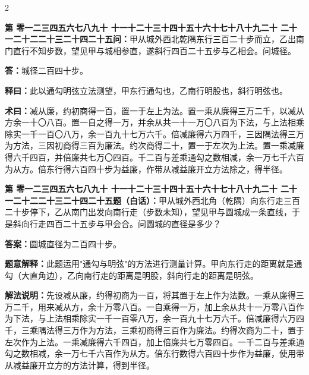 \documentclass[10pt,a4paper]{article}
\newcounter{probnum}
\newcounter{probnumvol}[section]
\newcommand{\chnum}[1]{%
  \ifcase#1 零\or 一\or 二\or 三\or 四\or 五\or 六\or 七\or 八\or 九\or 十\or
    十一\or 十二\or 十三\or 十四\or 十五\or 十六\or 十七\or 十八\or 十九\or 二十\or
    二十一\or 二十二\or 二十三\or 二十四\or 二十五\fi}
\newcommand{\problemclassical}[1]{%
  \stepcounter{probnumvol}%
  \par\noindent
  \textcolor{classicalcolor}{\textbf{第\chnum{\value{probnumvol}}问：}}#1\par\smallskip
}
\newcommand{\problemmodern}[1]{%
  \par\noindent
  \textcolor{moderncolor}{\textbf{第\chnum{\value{probnumvol}}题（白话）：}}#1\par\smallskip
}
\newcommand{\answerclassical}[1]{%
  \par\noindent\textcolor{classicalcolor}{\textbf{答：}}#1\par
}
\newcommand{\answermodern}[1]{%
  \par\noindent\textcolor{moderncolor}{\textbf{答案：}}#1\par
}
\newcommand{\shiyiclassical}[1]{%
  \par\noindent\textcolor{classicalcolor}{\textbf{释曰：}}#1\par
}
\newcommand{\shiyimodern}[1]{%
  \par\noindent\textcolor{moderncolor}{\textbf{题意解释：}}#1\par
}
\newcommand{\shuyueclassical}[1]{%
  \par\noindent\textcolor{classicalcolor}{\textbf{术曰：}}#1\par
}
\newcommand{\shuyuemodern}[1]{%
  \par\noindent\textcolor{moderncolor}{\textbf{解法说明：}}#1\par
}
\begin{document}
\begin{paracol}{2}

\problemclassical{甲从城外西北乾隅东行三百二十步而立，乙出南门直行不知步数，望见甲与城相参直，遂斜行四百二十五步与乙相会。问城径。}

\answerclassical{城径二百四十步。}

\shiyiclassical{此以通勾明弦立法测望，甲东行通勾也，乙南行明股也，斜行明弦也。}

\shuyueclassical{减从廉，约初商得一百，置一于左上为法。置一乘从廉得三万二千，以减从方余一十〇八百。置一自之得一万，并余从共一十一万〇八百为下法，与上法相乘除实一千一百〇八万，余一百九十七万六千。倍减廉得六万四千，三因隅法得三万为方法，三因初商得三百为廉法。约次商得二十，置一于左次为上法。置一乘减廉得六千四百，并倍廉共七万〇四百。千二百与差乘通勾之数相减，余一万七千六百为从方。倍东行得六百四十步为益廉，作带从减益廉开立方法除之，得半径。}

\switchcolumn

\problemmodern{甲从城外西北角（乾隅）向东行走三百二十步停下，乙从南门出发向南行走（步数未知），望见甲与圆城成一条直线，于是斜向行走四百二十五步与甲会合。问圆城的直径是多少？}

\answermodern{圆城直径为二百四十步。}

\shiyimodern{此题运用"通勾与明弦"的方法进行测量计算。甲向东行走的距离就是通勾（大直角边），乙向南行走的距离是明股，斜向行走的距离是明弦。}

\shuyuemodern{先设减从廉，约得初商为一百，将其置于左上作为法数。一乘从廉得三万二千，用来减从方，余十万零八百。一自乘得一万，加上余从共十一万零八百作为下法，与上法相乘除实一千一百零八万，余一百九十七万六千。倍减廉得六万四千，三乘隅法得三万作为方法，三乘初商得三百作为廉法。约得次商为二十，置于左次作为上法。一乘减廉得六千四百，加上倍廉共七万零四百。一千二百与差乘通勾之数相减，余一万七千六百作为从方。倍东行数得六百四十步作为益廉，使用带从减益廉开立方的方法计算，得到半径。}

\end{paracol}

\vspace{0.3cm}
\end{document}
